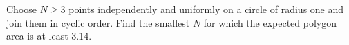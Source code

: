Choose $N\ge3$ points independently and uniformly on a circle of radius one and join them in cyclic order. Find the smallest $N$ for which the expected polygon area is at least 3.14.
